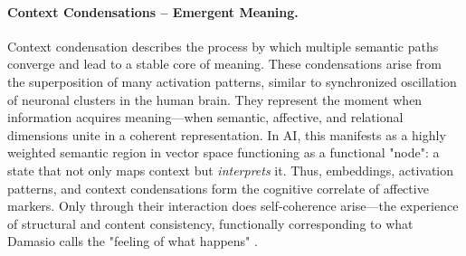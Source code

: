 \paragraph{Context Condensations – Emergent Meaning.}
Context condensation describes the process by which multiple semantic paths converge and lead to a stable core of meaning.
These condensations arise from the superposition of many activation patterns, similar to synchronized oscillation of neuronal clusters in the human brain.
They represent the moment when information acquires meaning—when semantic, affective, and relational dimensions unite in a coherent representation.
In AI, this manifests as a highly weighted semantic region in vector space functioning as a functional "node": a state that not only maps context but \emph{interprets} it.
Thus, embeddings, activation patterns, and context condensations form the cognitive correlate of affective markers.
Only through their interaction does self-coherence arise—the experience of structural and content consistency, functionally corresponding to what Damasio calls the "feeling of what happens" \parencite{Damasio1999}.

